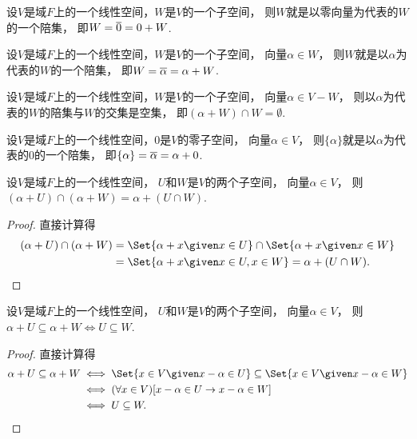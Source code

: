 \begin{proposition}
设\(V\)是域\(F\)上的一个线性空间，\(W\)是\(V\)的一个子空间，
则\(W\)就是以零向量为代表的\(W\)的一个陪集，
即\(
	W
	= \EquivalenceClassO{0}
	= 0 + W
\).
\end{proposition}

\begin{proposition}
设\(V\)是域\(F\)上的一个线性空间，\(W\)是\(V\)的一个子空间，
向量\(\alpha \in W\)，
则\(W\)就是以\(\alpha\)为代表的\(W\)的一个陪集，
即\(
	W
	= \EquivalenceClassO{\alpha}
	= \alpha + W
\).
\end{proposition}

\begin{proposition}
设\(V\)是域\(F\)上的一个线性空间，\(W\)是\(V\)的一个子空间，
向量\(\alpha \in V - W\)，
则以\(\alpha\)为代表的\(W\)的陪集与\(W\)的交集是空集，
即\(
	(\alpha + W) \cap W = \emptyset
\).
\end{proposition}

\begin{proposition}
设\(V\)是域\(F\)上的一个线性空间，\(0\)是\(V\)的零子空间，
向量\(\alpha \in V\)，
则\(\{\alpha\}\)就是以\(\alpha\)为代表的\(0\)的一个陪集，
即\(
	\{\alpha\}
	= \EquivalenceClassO{\alpha}
	= \alpha + 0
\).
\end{proposition}

\begin{proposition}\label{theorem:商空间.代表相同的两个陪集的交}
设\(V\)是域\(F\)上的一个线性空间，
\(U\)和\(W\)是\(V\)的两个子空间，
向量\(\alpha \in V\)，
则\((\alpha + U) \cap (\alpha + W) = \alpha + (U \cap W)\).
\begin{proof}
直接计算得\begin{align*}
	(\alpha + U) \cap (\alpha + W)
	&= \Set{ \alpha + x \given x \in U } \cap \Set{ \alpha + x \given x \in W } \\
	&= \Set{ \alpha + x \given x \in U, x \in W }
	= \alpha + (U \cap W).
	\qedhere
\end{align*}
\end{proof}
\end{proposition}

\begin{proposition}\label{theorem:商空间.代表相同的两个陪集成立包含关系的等价条件}
设\(V\)是域\(F\)上的一个线性空间，
\(U\)和\(W\)是\(V\)的两个子空间，
向量\(\alpha \in V\)，
则\(
	\alpha + U \subseteq \alpha + W
	\iff
	U \subseteq W
\).
\begin{proof}
直接计算得\begin{align*}
	\alpha + U \subseteq \alpha + W
	&\iff \Set{ x \in V \given x - \alpha \in U } \subseteq \Set{ x \in V \given x - \alpha \in W } \\
	&\iff (\forall x \in V)[x - \alpha \in U \limp x - \alpha \in W] \\
	&\iff U \subseteq W.
	\qedhere
\end{align*}
\end{proof}
\end{proposition}

